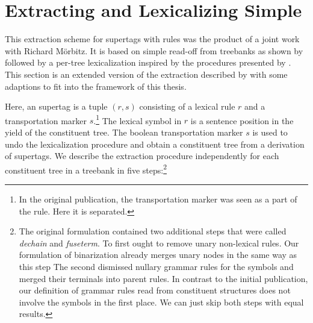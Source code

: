 \documentclass[../../document.tex]{subfiles}
\begin{document}
    \section{Extracting and Lexicalizing Simple } \label{sec:extraction:readoff}
    This extraction scheme for supertags with  rules was the product of a joint work with Richard Mörbitz. \citep{MoeRup20,RupMoe21}
    It is based on simple  read-off from treebanks as shown by \citet{KalMai13} followed by a per-tree lexicalization inspired by the procedures presented by \citet{EngMalMan18}.
    This section is an extended version of the extraction described by \citet{RupMoe21} with some adaptions to fit into the framework of this thesis.

    Here, an  supertag is a tuple \((r, s)\) consisting of a lexical rule \(r\) and a transportation marker \(s\).\footnote{
        In the original publication, the transportation marker was seen as a part of the  rule.
        Here it is separated.
    }
    The lexical symbol in \(r\) is a sentence position in the yield of the constituent tree.
    The boolean transportation marker \(s\) is used to undo the lexicalization procedure and obtain a constituent tree from a derivation of supertags.
    We describe the extraction procedure independently for each constituent tree in a treebank in five steps:\footnote{\label{footnote:lcfrs:split}
        The original formulation contained two additional steps that were called \emph{dechain} and \emph{fuseterm}.
        To first ought to remove unary non-lexical rules.
        Our formulation of binarization already merges unary nodes in the same way as this step
        The second dismissed nullary grammar rules for the  symbols and merged their terminals into parent rules.
        In contrast to the initial publication, our definition of grammar rules read from constituent structures does not involve the  symbols in the first place.
        We can just skip both steps with equal results.
    }
\end{document}
